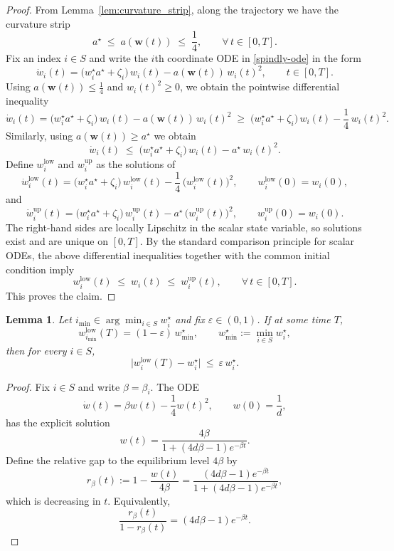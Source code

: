 \documentclass{article}
\theoremstyle{plain}
\newtheorem{lemma}[theorem]{Lemma}
\theoremstyle{definition}
\theoremstyle{remark}
\begin{document}
{\begin{proof}
From Lemma~\ref{lem:curvature_strip}, along the trajectory we have the curvature strip
\[
a^\star \;\le\; a(\boldsymbol w(t)) \;\le\; \frac14,
\qquad \forall\,t\in[0,T].
\]
Fix an index $i\in S$ and write the $i$th coordinate ODE in \eqref{spindly-ode} in the form
\begin{equation}
\dot w_i(t)
=
\bigl(w_i^\star a^\star+\zeta_i\bigr)\,w_i(t)
-
a(\boldsymbol w(t))\,w_i(t)^2,
\qquad t\in[0,T].
\label{eq:wi_true_ode_for_comparison}
\end{equation}
Using $a(\boldsymbol w(t))\le \tfrac14$ and $w_i(t)^2\ge 0$, we obtain the pointwise differential inequality
\[
\dot w_i(t)
=
\bigl(w_i^\star a^\star+\zeta_i\bigr)\,w_i(t)-a(\boldsymbol w(t))\,w_i(t)^2
\;\ge\;
\bigl(w_i^\star a^\star+\zeta_i\bigr)\,w_i(t)-\frac14\,w_i(t)^2.
\]
Similarly, using $a(\boldsymbol w(t))\ge a^\star$ we obtain
\[
\dot w_i(t)
\;\le\;
\bigl(w_i^\star a^\star+\zeta_i\bigr)\,w_i(t)-a^\star\,w_i(t)^2.
\]
Define $w_i^{\mathrm{low}}$ and $w_i^{\mathrm{up}}$ as the solutions of
\[
\dot w_i^{\mathrm{low}}(t)
=
\bigl(w_i^\star a^\star+\zeta_i\bigr)\,w_i^{\mathrm{low}}(t)-\frac14\,\bigl(w_i^{\mathrm{low}}(t)\bigr)^2,
\qquad
w_i^{\mathrm{low}}(0)=w_i(0),
\]
and
\[
\dot w_i^{\mathrm{up}}(t)
=
\bigl(w_i^\star a^\star+\zeta_i\bigr)\,w_i^{\mathrm{up}}(t)-a^\star\,\bigl(w_i^{\mathrm{up}}(t)\bigr)^2,
\qquad
w_i^{\mathrm{up}}(0)=w_i(0).
\]
The right-hand sides are locally Lipschitz in the scalar state variable, so solutions exist and are unique on $[0,T]$.
By the standard comparison principle for scalar ODEs, the above differential inequalities together with the common initial
condition imply
\[
w_i^{\mathrm{low}}(t)\;\le\; w_i(t)\;\le\; w_i^{\mathrm{up}}(t),
\qquad \forall\,t\in[0,T].
\]
This proves the claim.
\end{proof}


\begin{lemma}
\label{lem:weakest_controls_all}
Let $i_{\min}\in\arg\min_{i\in S} w_i^\star$ and fix $\varepsilon\in(0,1)$.
If at some time $T$,
\[
w_{i_{\min}}^{\mathrm{low}}(T)=(1-\varepsilon)\,w_{\min}^\star,
\qquad
w_{\min}^\star:=\min_{i\in S} w_i^\star,
\]
then for every $i\in S$,
\[
\bigl|w_i^{\mathrm{low}}(T)-w_i^\star\bigr|\ \le\ \varepsilon\,w_i^\star .
\]
\end{lemma}



\begin{proof}
Fix $i\in S$ and write $\beta=\beta_i$. The ODE
\[
\dot w(t)=\beta w(t)-\frac14 w(t)^2,
\qquad w(0)=\frac1d,
\]
has the explicit solution
\[
w(t)=\frac{4\beta}{1+(4d\beta-1)e^{-\beta t}}.
\]
Define the relative gap to the equilibrium level $4\beta$ by
\[
r_\beta(t):=1-\frac{w(t)}{4\beta}=\frac{(4d\beta-1)e^{-\beta t}}{1+(4d\beta-1)e^{-\beta t}},
\]
which is decreasing in $t$. Equivalently,
\[
\frac{r_\beta(t)}{1-r_\beta(t)}=(4d\beta-1)e^{-\beta t}.
\]


\end{proof}}
\end{document}
